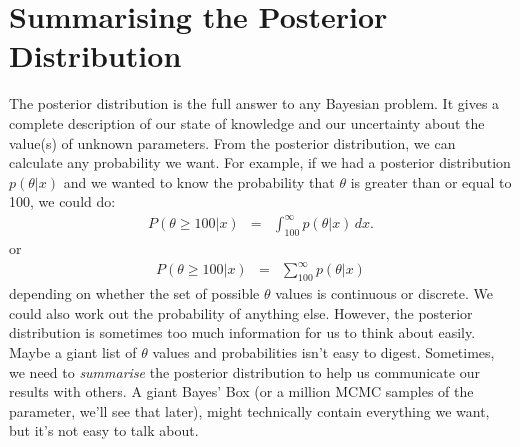\chapter{Summarising the Posterior Distribution}
The posterior distribution is the full answer to any Bayesian problem. It gives
a complete description of our state of knowledge and our uncertainty about the
value(s) of unknown
parameters. From the posterior distribution, we can calculate any probability
we want. For example, if we had a posterior distribution $p(\theta|x)$ and we
wanted to know the probability that $\theta$ is greater than or equal to 100, we could do:
\begin{eqnarray}
P(\theta \geq 100 | x) &=& \int_{100}^\infty p(\theta | x) \, dx.
\end{eqnarray}
or
\begin{eqnarray}
P(\theta \geq 100 | x) &=& \sum_{100}^\infty p(\theta | x)
\end{eqnarray}
depending on whether the set of possible $\theta$ values is continuous or
discrete. We could also work out the probability of anything else.
However, the posterior distribution is sometimes too much
information for us to think about easily. Maybe a giant list of $\theta$
values and probabilities isn't easy to digest. Sometimes,
we need to {\it summarise} the posterior distribution to help us
communicate our results with others. A giant Bayes' Box (or a million MCMC
samples of the parameter, we'll see that later), might technically
contain everything we want, but it's not easy to talk about.

